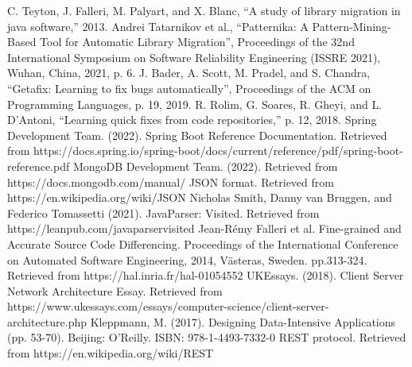 \documentclass[letterpaper, 10 pt, conference]{ieeeconf}  %
\begin{document}
\begin{thebibliography}{99}
 C. Teyton, J. Falleri, M. Palyart, and X. Blanc, “A study of
library migration in java software,” 2013.
 Andrei Tatarnikov et al., “Patternika: A
Pattern-Mining-Based Tool for Automatic Library Migration”,
Proceedings of the 32nd International Symposium on Software
Reliability Engineering (ISSRE 2021), Wuhan, China, 2021, p. 6.
 J. Bader, A. Scott, M. Pradel, and S. Chandra, “Getafix:
Learning to fix bugs automatically”, Proceedings of the ACM on Programming
Languages, p. 19, 2019.
 R. Rolim, G. Soares, R. Gheyi, and L. D’Antoni, “Learning
quick fixes from code repositories,” p. 12, 2018.
 Spring Development Team. (2022). Spring Boot Reference
Documentation. Retrieved from
https://docs.spring.io/spring-boot/docs/current/reference/pdf/spring-boot-reference.pdf
 MongoDB Development Team. (2022). Retrieved from
https://docs.mongodb.com/manual/
 JSON format. Retrieved from https://en.wikipedia.org/wiki/JSON
 Nicholas Smith, Danny van Bruggen, and Federico Tomassetti
(2021). JavaParser: Visited. Retrieved from
https://leanpub.com/javaparservisited
 Jean-Rémy Falleri et al. Fine-grained and Accurate Source Code
Differencing. Proceedings of the International Conference on Automated
Software Engineering, 2014, Västeras, Sweden. pp.313-324. Retrieved from
https://hal.inria.fr/hal-01054552
 UKEssays. (2018). Client Server Network Architecture Essay.
Retrieved from https://www.ukessays.com/essays/computer-science/client-server-architecture.php
 Kleppmann, M. (2017). Designing Data-Intensive Applications (pp.
53-70). Beijing: O'Reilly. ISBN: 978-1-4493-7332-0
 REST protocol. Retrieved from
https://en.wikipedia.org/wiki/REST
\end{thebibliography}
\end{document}
